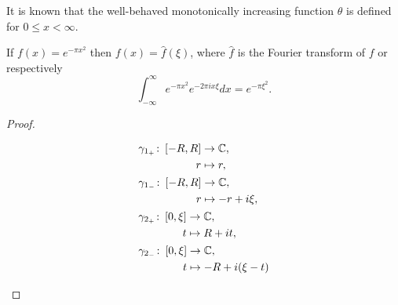 \begin{remark}
	It is known that the well-behaved monotonically increasing function $\theta$ is defined for $0 \leq x < \infty$.
\end{remark}


\begin{proposition}
	If $f(x) = e^{-\pi x^2}$ then $f(x) = \hat{f}(\xi)$, where $\hat{f}$ is the Fourier transform of $f$ or respectively
\begin{equation*}
		\int _{-\infty} ^\infty e^{-\pi x^2} e^{-2 \pi i x \xi} dx = e^{-\pi \xi^2}.
\end{equation*}
\end{proposition}
\begin{proof}
\begin{figure}[!htb]
\begin{minipage}[c]{0.5\textwidth}
\centering
\begin{equation*}
\begin{aligned}
	&\begin{aligned}
		\gamma_{1_+} \colon \left[-R, R\right] &\to \mathbb{C}, \\ r &\mapsto r,
	\end{aligned} \\
	&\begin{aligned}
		\gamma_{1_-} \colon \left[-R, R\right] &\to \mathbb{C}, \\ r &\mapsto -r + i\xi,
	\end{aligned} \\
	&\begin{aligned}
		\gamma_{2_+} \colon \left[0, \xi\right] &\to \mathbb{C}, \\ t &\mapsto R + it,
	\end{aligned} \\
	&\begin{aligned}
		\gamma_{2_-} \colon \left[0, \xi\right] &\to \mathbb{C}, \\ t &\mapsto -R + i(\xi - t)
	\end{aligned}
\end{aligned}
\end{equation*}
\end{minipage}
\begin{minipage}[c]{0.5\textwidth}
\raggedleft
{}
\end{minipage}
\end{figure}
\end{proof}
